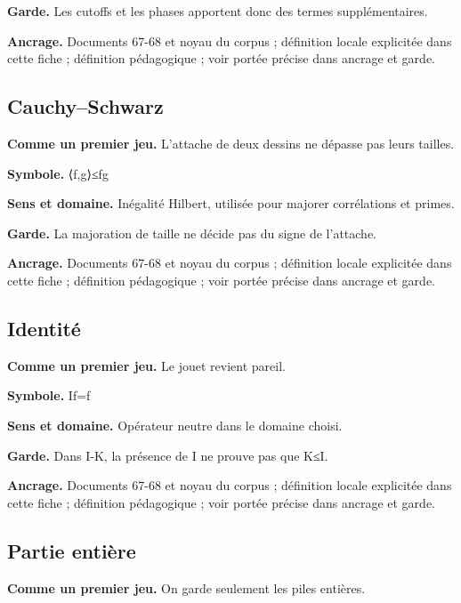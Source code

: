 \documentclass[
  9pt,
  a4paper,
]{article}
\begin{document}
\textbf{Garde.} Les cutoffs et les phases apportent donc des termes
supplémentaires.

\textbf{Ancrage.} Documents 67-68 et noyau du corpus ; définition locale
explicitée dans cette fiche ; définition pédagogique ; voir portée
précise dans ancrage et garde.

\hypertarget{cauchyschwarz}{%
\subsection{Cauchy--Schwarz}\label{cauchyschwarz}}

\textbf{Comme un premier jeu.} L'attache de deux dessins ne dépasse pas
leurs tailles.

\textbf{Symbole.}
\textbar⟨f,g⟩\textbar≤\textbar\textbar f\textbar\textbar\textbar\textbar g\textbar\textbar{}

\textbf{Sens et domaine.} Inégalité Hilbert, utilisée pour majorer
corrélations et primes.

\textbf{Garde.} La majoration de taille ne décide pas du signe de
l'attache.

\textbf{Ancrage.} Documents 67-68 et noyau du corpus ; définition locale
explicitée dans cette fiche ; définition pédagogique ; voir portée
précise dans ancrage et garde.

\hypertarget{identituxe9}{%
\subsection{Identité}\label{identituxe9}}

\textbf{Comme un premier jeu.} Le jouet revient pareil.

\textbf{Symbole.} If=f

\textbf{Sens et domaine.} Opérateur neutre dans le domaine choisi.

\textbf{Garde.} Dans I-K, la présence de I ne prouve pas que K≤I.

\textbf{Ancrage.} Documents 67-68 et noyau du corpus ; définition locale
explicitée dans cette fiche ; définition pédagogique ; voir portée
précise dans ancrage et garde.

\hypertarget{partie-entiuxe8re}{%
\subsection{Partie entière}\label{partie-entiuxe8re}}

\textbf{Comme un premier jeu.} On garde seulement les piles entières.
\end{document}
